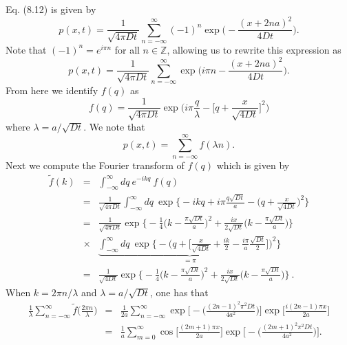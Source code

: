Eq. (8.12) is given by
\begin{equation}
p(x,t) = \frac{1}{\sqrt{4 \pi D t}} \sum_{n=-\infty}^{\infty} (-1)^n \exp \bigg( -\frac{(x+2na)^2}{4Dt} \bigg). \nonumber 
\end{equation}
Note that $(-1)^n = e^{i\pi n}$ for all $n\in \mathbb{Z}$, allowing us to rewrite this expression as
\begin{equation}
p(x,t) = \frac{1}{\sqrt{4 \pi D t}} \sum_{n=-\infty}^{\infty} \exp \bigg(i\pi n -\frac{(x+2na)^2}{4Dt} \bigg). \nonumber 
\end{equation}
From here we identify $f(q)$ as
\begin{equation}
f(q) = \frac{1}{\sqrt{4 \pi D t} } \exp\bigg( i\pi \frac{q}{\lambda} - \bigg[q + \frac{x}{\sqrt{4Dt}}\bigg]^2\bigg) \nonumber
\end{equation}
where $\lambda=a/\sqrt{Dt}$. We note that
\begin{equation}
p(x,t)=\sum_{n=-\infty}^{\infty} f(\lambda n). \nonumber
\end{equation}
Next we compute the Fourier transform of $f(q)$ which is given by
\begin{eqnarray}
\tilde{f}(k) &=& \int_{-\infty}^{\infty} dq~e^{-i k q}~f(q) \nonumber \\
&=& \frac{1}{\sqrt{4 \pi D t}} \int_{-\infty}^{\infty} dq~\exp\bigg\{-ikq + i\pi \frac{q \sqrt{Dt}}{a} - \bigg(q + \frac{x}{\sqrt{4 Dt}}\bigg)^2 \bigg\} \nonumber \\
&=& \frac{1}{\sqrt{4\pi Dt}} \exp\bigg\{-\frac{1}{4} \bigg( k - \frac{\pi \sqrt{Dt}}{a}\bigg)^2 + \frac{i x}{2 \sqrt{Dt}} \bigg( k - \frac{\pi \sqrt{Dt}}{a}\bigg) \bigg\} \nonumber \\
&\times & \underbrace{\int_{-\infty}^{\infty} dq~ \exp\bigg\{-\bigg(q + \bigg[\frac{x}{\sqrt{4Dt}} + \frac{ik}{2} - \frac{i\pi}{a} \frac{\sqrt{Dt}}{2} \bigg] \bigg)^2 \bigg\}}_{=\pi} \nonumber \\
&=& \boxed{\frac{1}{\sqrt{4Dt}} \exp\bigg\{-\frac{1}{4} \bigg( k - \frac{\pi \sqrt{Dt}}{a}\bigg)^2 + \frac{i x}{2 \sqrt{Dt}} \bigg( k - \frac{\pi \sqrt{Dt}}{a}\bigg) \bigg\}}~.
\end{eqnarray}
When $k=2\pi n/\lambda$ and $\lambda = a/\sqrt{Dt}$, one has that
\begin{eqnarray}
\frac{1}{\lambda} \sum_{n=-\infty}^{\infty} \tilde{f}\bigg(\frac{2 \pi n}{\lambda}\bigg) &=& \frac{1}{2a} \sum_{n=-\infty}^{\infty}\exp \bigg[ - \bigg( \frac{(2n-1)^2 \pi^2 D t}{4 a^2} \bigg) \bigg] \exp \bigg[ \frac{i (2n-1) \pi x}{2 a } \bigg]  \nonumber \\
&=& \frac{1}{a} \sum_{m=0}^{\infty}\cos \bigg[ \frac{(2m+1) \pi x}{2 a } \bigg] \exp \bigg[ - \bigg( \frac{(2m+1)^2 \pi^2 D t}{4 a^2} \bigg) \bigg].
\end{eqnarray}
